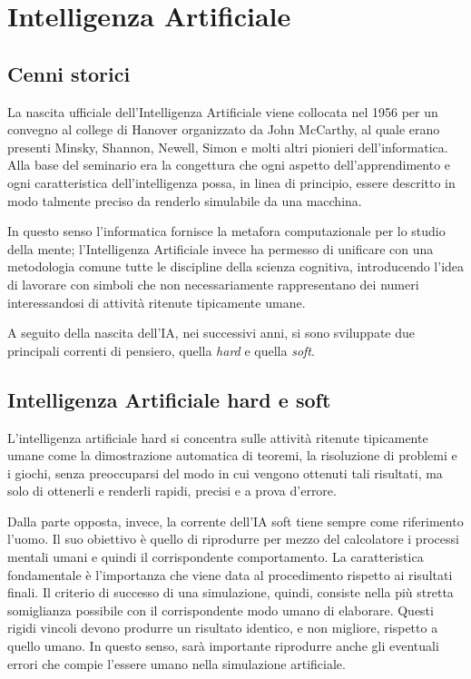 \chapter{Intelligenza Artificiale}
\section{Cenni storici}
La nascita ufficiale dell’Intelligenza Artificiale viene collocata nel 1956 per un convegno al college di Hanover organizzato da John McCarthy, al quale erano presenti Minsky, Shannon, Newell, Simon e molti altri pionieri dell’informatica. Alla base del seminario era la congettura che ogni aspetto dell’apprendimento e ogni caratteristica dell’intelligenza possa, in linea di principio, essere descritto in modo talmente preciso da renderlo simulabile da una macchina.

In questo senso l’informatica fornisce la metafora computazionale per lo studio della mente; l’Intelligenza Artificiale invece ha permesso di unificare con una metodologia comune tutte le discipline della scienza cognitiva, introducendo l’idea di lavorare con simboli che non necessariamente rappresentano dei numeri interessandosi di attività ritenute tipicamente umane.

A seguito della nascita dell’IA, nei successivi anni, si sono sviluppate due principali correnti di pensiero, quella \emph{hard} e quella \emph{soft}.

\section{Intelligenza Artificiale hard e soft}
L’intelligenza artificiale hard si concentra sulle attività ritenute tipicamente umane come la dimostrazione automatica di teoremi, la risoluzione di problemi e i giochi, senza preoccuparsi del modo in cui vengono ottenuti tali risultati, ma solo di ottenerli e renderli rapidi, precisi e a prova d’errore.

Dalla parte opposta, invece, la corrente dell’IA soft tiene sempre come riferimento l’uomo. Il suo obiettivo è quello di riprodurre per mezzo del calcolatore i processi mentali umani e quindi il corrispondente comportamento. La caratteristica fondamentale è l’importanza che viene data al procedimento rispetto ai risultati finali. Il criterio di successo di una simulazione, quindi, consiste nella più stretta somiglianza possibile con il corrispondente modo umano di elaborare. Questi rigidi vincoli devono produrre un risultato identico, e non migliore, rispetto a quello umano. In questo senso, sarà importante riprodurre anche gli eventuali errori che compie l’essere umano nella simulazione artificiale.

